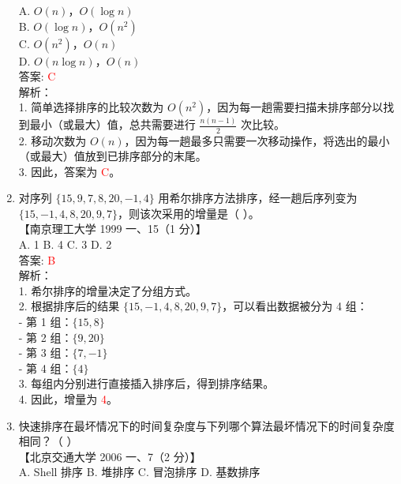 \documentclass[lang=cn,newtx,10pt,scheme=chinese]{../../../elegantbook}
\begin{document}
\begin{enumerate}
    A. $O(n)$，$O(\log n)$ \\  
    B. $O(\log n)$，$O(n^2)$ \\  
    C. $O(n^2)$，$O(n)$ \\  
    D. $O(n \log n)$，$O(n)$ \\  

    答案: \textcolor{red}{C} \\

    解析：\\
    1. 简单选择排序的比较次数为 $O(n^2)$，因为每一趟需要扫描未排序部分以找到最小（或最大）值，总共需要进行 $\frac{n(n-1)}{2}$ 次比较。\\
    2. 移动次数为 $O(n)$，因为每一趟最多只需要一次移动操作，将选出的最小（或最大）值放到已排序部分的末尾。\\
    3. 因此，答案为 \textcolor{red}{C}。\\

    \item 对序列 $\{15, 9, 7, 8, 20, -1, 4\}$ 用希尔排序方法排序，经一趟后序列变为 $\{15, -1, 4, 8, 20, 9, 7\}$，则该次采用的增量是（ ）。\\
    【南京理工大学 1999 一、15（1 分）】\\  

    A. 1 \quad B. 4 \quad C. 3 \quad D. 2 \\

    答案: \textcolor{red}{B} \\

    解析：\\
    1. 希尔排序的增量决定了分组方式。\\
    2. 根据排序后的结果 $\{15, -1, 4, 8, 20, 9, 7\}$，可以看出数据被分为 4 组：\\
       - 第 1 组：$\{15, 8\}$\\
       - 第 2 组：$\{9, 20\}$\\
       - 第 3 组：$\{7, -1\}$\\
       - 第 4 组：$\{4\}$\\
    3. 每组内分别进行直接插入排序后，得到排序结果。\\
    4. 因此，增量为 \textcolor{red}{4}。\\

\item 快速排序在最坏情况下的时间复杂度与下列哪个算法最坏情况下的时间复杂度相同？（ ）\\
    【北京交通大学 2006 一、7（2 分）】\\  

    A. Shell 排序 \quad B. 堆排序 \quad C. 冒泡排序 \quad D. 基数排序 \\


\end{enumerate}
\end{document}
